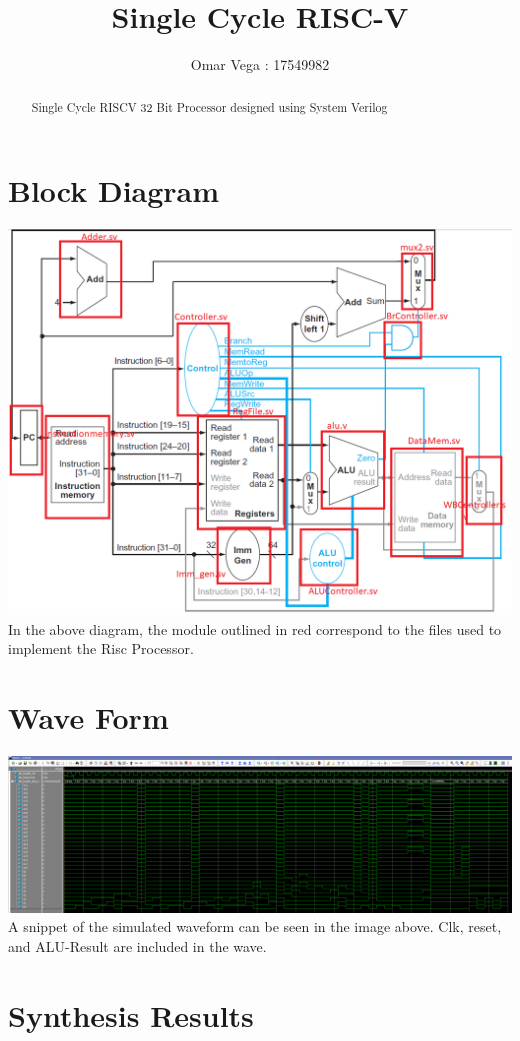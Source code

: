 \documentclass[a4paper]{article}
\title{Single Cycle RISC-V }
\author{Omar Vega : 17549982}
\begin{document}
\maketitle

\begin{abstract}
Single Cycle RISCV 32 Bit Processor designed using System Verilog
\end{abstract}

\section{Block Diagram}
\includegraphics[width=1.0\textwidth]{block_-_Copy.PNG}
In the above diagram, the module outlined in red correspond to the files used to implement the Risc Processor.

\section{Wave Form}
\includegraphics[width=1.0\textwidth]{wave2.PNG}
A snippet of the simulated waveform can be seen in the image above. Clk, reset, and ALU-Result are included in the wave.

\section{Synthesis Results}
\end{document}
